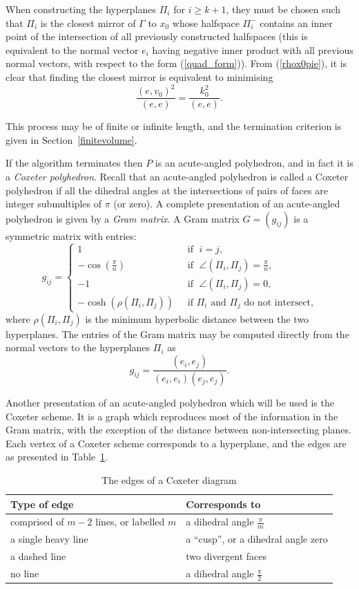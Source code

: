 \documentclass[smallcondensed]{svjour3}                     %
\begin{document}
When constructing the hyperplanes $\Pi_i$ for $i \ge k+1$, they must be chosen such that $\Pi_i$ is the closest mirror of $\Gamma$ to $x_0$ whose halfspace $\Pi_i^-$ contains an inner point of the intersection of all previously constructed halfspaces (this is equivalent to the normal vector $e_i$ having negative inner product with all previous normal vectors, with respect to the form (\ref{quad_form})). From (\ref{rhox0pie}), it is clear that finding the closest mirror is equivalent to minimising
\begin{equation}\label{minimise}
\frac{(e,v_0)^2}{(e,e)} = \frac{k_0^2}{(e,e)}.
\end{equation}

This process may be of finite or infinite length, and the termination criterion is given in Section~\ref{finitevolume}.

If the algorithm terminates then $P$ is an acute-angled polyhedron, and in fact it is a \emph{Coxeter polyhedron}. Recall that an acute-angled polyhedron is called a Coxeter polyhedron if all the dihedral angles at the intersections of pairs of faces are integer submultiples of $\pi$ (or zero). A complete presentation of an acute-angled polyhedron is given by a \emph{Gram matrix}. A Gram matrix $G = (g_{ij})$ is a symmetric matrix with entries:
\begin{equation*}
  g_{ij} = \left\{
  \begin{array}{ll}
    1 &  \; \text{ if } \; i = j,\\
    -\cos(\frac{\pi}{n}) &  \; \text{ if } \; \angle (\Pi_i, \Pi_j) = \frac{\pi}{n},\\
    -1 &  \; \text{ if } \; \angle (\Pi_i, \Pi_j) = 0,\\
    -\cosh(\rho(\Pi_i, \Pi_j)) &  \; \text{ if $\Pi_i$ and $\Pi_j$ do not intersect,}
   \end{array}\right.
\end{equation*}
where $\rho(\Pi_i, \Pi_j)$ is the minimum hyperbolic distance between the two hyperplanes. The entries of the Gram matrix may be computed directly from the normal vectors to the hyperplanes $\Pi_i$ as
\[g_{ij}=\frac{(e_i, e_j)}{(e_i, e_i)(e_j,e_j)}.\]

Another presentation of an acute-angled polyhedron which will be used is the Coxeter scheme. It is a graph which reproduces most of the information in the Gram matrix, with the exception of the distance between non-intersecting planes. Each vertex of a Coxeter scheme corresponds to a hyperplane, and the edges are as presented in Table~\ref{coxeteredges}.
\begin{table}[H]
\caption{\label{coxeteredges} The edges of a Coxeter diagram}
\centering
\begin{tabular}{l|l} 
  Type of edge & Corresponds to\\
  \hline
  comprised of $m-2$ lines, or labelled $m$ & a dihedral angle $\frac{\pi}{m}$\\
  a single heavy line & a ``cusp'', or a dihedral angle zero\\
  a dashed line & two divergent faces\\
  no line & a dihedral angle $\frac{\pi}{2}$
\end{tabular}
\end{table}
\end{document}
